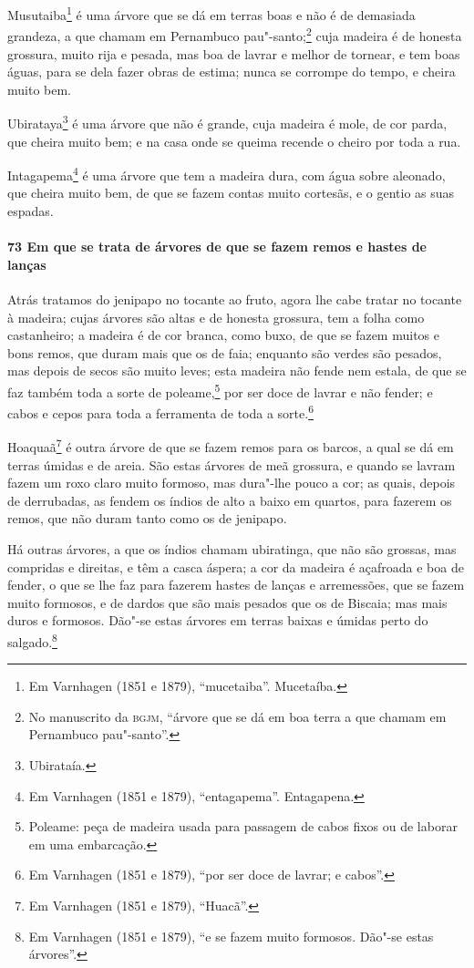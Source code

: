 Musutaiba\footnote{ Em Varnhagen (1851 e 1879), ``mucetaiba''. Mucetaíba.} é uma árvore
que se dá em terras boas e não é de demasiada grandeza, a que chamam em Pernambuco
pau"-santo;\footnote{ No manuscrito da \textsc{bgjm}, ``árvore que se dá em boa terra a que
chamam em Pernambuco pau"-santo''.} cuja madeira é de honesta grossura, muito rija e
pesada, mas boa de lavrar e melhor de tornear, e tem boas águas, para se dela fazer obras
de estima; nunca se corrompe do tempo, e cheira muito bem.

Ubirataya\footnote{ Ubirataía.} é uma árvore que não é grande, cuja madeira é mole, de cor
parda, que cheira muito bem; e na casa onde se queima recende o cheiro por toda a rua.

Intagapema\footnote{ Em Varnhagen (1851 e 1879), ``entagapema''. Entagapena.} é uma árvore
que tem a madeira dura, com água sobre aleonado, que cheira muito bem, de que se fazem
contas muito cortesãs, e o gentio as suas espadas.

\paragraph{73 Em que se trata de árvores de que se fazem remos e hastes de lanças}

Atrás tratamos do jenipapo no tocante ao fruto, agora lhe cabe tratar no tocante à
madeira; cujas árvores são altas e de honesta grossura, tem a folha como castanheiro; a
madeira é de cor branca, como buxo, de que se fazem muitos e bons remos, que duram mais
que os de faia; enquanto são verdes são pesados, mas depois de secos são muito leves; esta
madeira não fende nem estala, de que se faz também toda a sorte de poleame,\footnote{
Poleame: peça de madeira usada para passagem de cabos fixos ou de laborar em uma
embarcação.} por ser doce de lavrar e não fender; e cabos e cepos para toda a ferramenta
de toda a sorte.\footnote{ Em Varnhagen (1851 e 1879), ``por ser doce de lavrar; e
cabos''.}

Hoaquaã\footnote{ Em Varnhagen (1851 e 1879), ``Huacã''.} é outra árvore de que se fazem
remos para os barcos, a qual se dá em terras úmidas e de areia. São estas árvores de meã
grossura, e quando se lavram fazem um roxo claro muito formoso, mas dura"-lhe pouco a cor;
as quais, depois de derrubadas, as fendem os índios de alto a baixo em quartos, para
fazerem os remos, que não duram tanto como os de jenipapo.

Há outras árvores, a que os índios chamam ubiratinga, que não são grossas, mas compridas e
direitas, e têm a casca áspera; a cor da madeira é açafroada e boa de fender, o que se lhe
faz para fazerem hastes de lanças e arremessões, que se fazem muito formosos, e de dardos
que são mais pesados que os de Biscaia; mas mais duros e formosos. Dão"-se estas árvores em
terras baixas e úmidas perto do salgado.\footnote{ Em Varnhagen (1851 e 1879), ``e se
fazem muito formosos. Dão"-se estas árvores''.}

